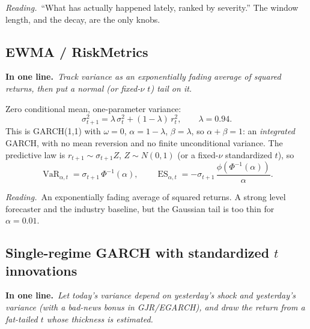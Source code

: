 \documentclass[11pt,a4paper]{article}
\newcommand{\VaR}{\operatorname{VaR}}
\newcommand{\ES}{\operatorname{ES}}
\newcommand{\intuition}[1]{\par\smallskip\noindent\textit{Reading.}\ #1\par\smallskip}
\newcommand{\inbrief}[1]{\par\noindent\textbf{In one line.}\ \textit{#1}\par\smallskip}
\begin{document}
\intuition{``What has actually happened lately, ranked by severity.'' The window
length, and the decay, are the only knobs.}

\subsection{EWMA / RiskMetrics}

\inbrief{Track variance as an exponentially fading average of squared returns,
then put a normal (or fixed-$\nu$ $t$) tail on it.}

Zero conditional mean, one-parameter variance:
\begin{equation}
  \sigma_{t+1}^2 = \lambda\,\sigma_t^2 + (1-\lambda)\,r_t^2,
  \qquad \lambda = 0.94 .
\end{equation}
This is GARCH(1,1) with $\omega=0$, $\alpha = 1-\lambda$, $\beta = \lambda$, so
$\alpha+\beta=1$: an \emph{integrated} GARCH, with no mean reversion and no
finite unconditional variance. The predictive law is
$r_{t+1}\sim\sigma_{t+1}Z$, $Z\sim N(0,1)$ (or a fixed-$\nu$ standardized $t$),
so
\begin{equation}
  \VaR_{\alpha,t} = \sigma_{t+1}\,\Phi^{-1}(\alpha),
  \qquad
  \ES_{\alpha,t} = -\sigma_{t+1}\,\frac{\phi(\Phi^{-1}(\alpha))}{\alpha}.
\end{equation}

\intuition{An exponentially fading average of squared returns. A strong level
forecaster and the industry baseline, but the Gaussian tail is too thin for
$\alpha=0.01$.}

\subsection{Single-regime GARCH with standardized \texorpdfstring{$t$}{t} innovations}\label{sec:garch}

\inbrief{Let today's variance depend on yesterday's shock and yesterday's
variance (with a bad-news bonus in GJR/EGARCH), and draw the return from a
fat-tailed $t$ whose thickness is estimated.}
\end{document}
